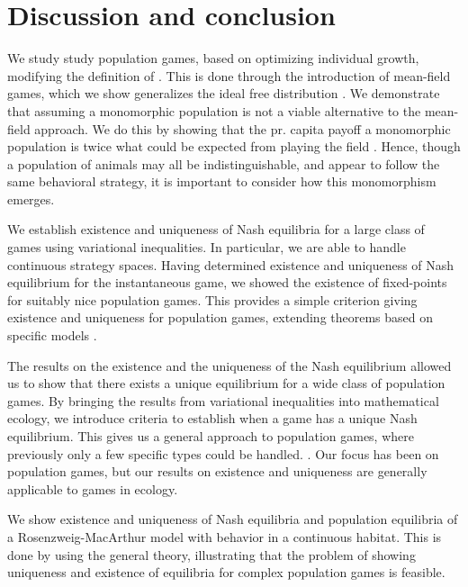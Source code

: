 \section{Discussion and conclusion}

We study study population games, based on optimizing individual growth, modifying the definition of \citep{vincent2005evolutionary}. This is done through the introduction of mean-field games, which we show generalizes the ideal free distribution \citep{fretwell1969territorial}. We demonstrate that assuming a monomorphic population is not a viable alternative to the mean-field approach. We do this by showing that the pr. capita payoff a monomorphic population is twice what could be expected from playing the field  \citep{parker1978searching} . Hence, though a population of animals may all be indistinguishable, and appear to follow the same behavioral strategy, it is important to consider how this monomorphism emerges.

We establish existence and uniqueness of Nash equilibria for a large class of games using variational inequalities. In particular, we are able to handle continuous strategy spaces. Having determined existence and uniqueness of Nash equilibrium for the instantaneous game, we showed the existence of fixed-points for suitably nice population games. This provides a simple criterion giving existence and uniqueness for population games, extending theorems based on specific models \citep{cressman2010ideal}.

The results on the existence and the uniqueness of the Nash equilibrium allowed us to show that there exists a unique equilibrium for a wide class of population games. By bringing the results from variational inequalities into mathematical ecology, we introduce criteria to establish when a game has a unique Nash equilibrium. This gives us a general approach to population games, where previously only a few specific types could be handled. \citep{sandholm2010population}. Our focus has been on population games, but our results on existence and uniqueness are generally applicable to games in ecology.


We show existence and uniqueness of Nash equilibria and population equilibria of a Rosenzweig-MacArthur model with behavior in a continuous habitat. This is done by using the general theory, illustrating that the problem of showing uniqueness and existence of equilibria for complex population games is feasible.



